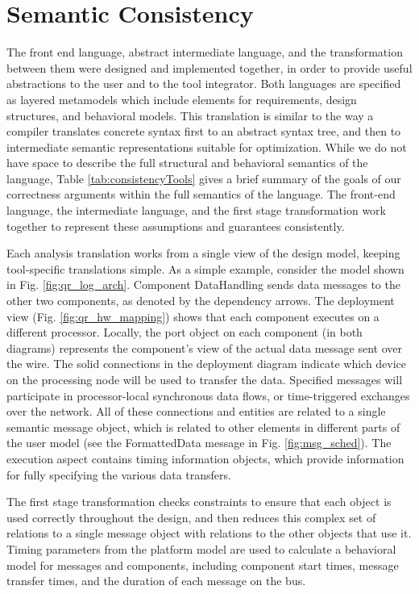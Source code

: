\section{Semantic Consistency}

The front end language, abstract intermediate language, and the transformation between them 
were designed and implemented together, in order to provide useful abstractions to the user 
and to the tool integrator.  Both languages are specified as layered metamodels 
\cite{mic:overview} which include elements for requirements, design structures, and behavioral 
models.   This translation is similar to the way a compiler translates concrete syntax first 
to an abstract syntax tree, and then to intermediate semantic representations suitable for optimization.
While we do not have space to describe the full
structural and behavioral semantics of the language, Table
\ref{tab:consistencyTools} gives a brief summary of the goals of our
correctness arguments within the full semantics of the language.  The front-end
language, the intermediate language, and the first stage transformation work
together to represent these assumptions and guarantees consistently.

Each analysis translation works from a single view of the design model, keeping 
tool-specific translations simple.  As a simple example, consider the model
shown in Fig. \ref{fig:qr_log_arch}.   Component
DataHandling sends data messages to the other two components, as denoted by the
dependency arrows.  The deployment
view (Fig. \ref{fig:qr_hw_mapping}) shows that each component executes on a
different processor.  Locally, the port object on each component (in both
diagrams) represents the component's view of the actual data message sent over
the wire. The solid connections in the deployment diagram indicate which device
on the processing node will be used to transfer the data.  Specified messages
will participate in processor-local synchronous data flows, or time-triggered
exchanges over the network.  All of these connections and entities are related
to a single semantic message object, which is related to other elements in
different parts of the user model (see the FormattedData message in Fig.
\ref{fig:msg_sched}).  The execution aspect contains timing
information objects, which provide information for fully specifying
the various data transfers.

The first stage transformation checks constraints to ensure that each object is used 
correctly throughout the design, and then reduces this complex set of relations
to a single message object with relations to the other objects that use it. 
Timing parameters from the platform model are used to calculate a behavioral
model for messages and components, including component start times, message 
transfer times, and the duration of each message on the bus.

